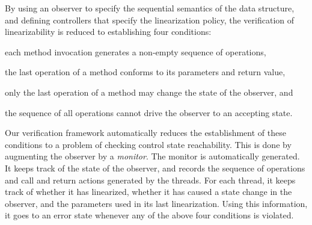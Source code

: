  By using an observer to specify the sequential semantics of the
data structure, and defining controllers that specify the linearization policy,
the verification of linearizability is reduced to establishing four conditions:
\begin{inparaenum}[(i)]
\item
  each method invocation generates a non-empty sequence of operations,
\item
  the last operation of a method conforms to its parameters and return value,
\item
  only the last operation of a method may
  change the state of the observer,
  and
\item
  the sequence of all operations
  cannot drive the observer to an accepting state.
\end{inparaenum}
Our verification framework automatically reduces
the establishment of these conditions to 
a problem of checking control state reachability. This is done by
augmenting the observer by a {\em monitor}. The monitor is automatically
generated. It keeps track of 
the state of the observer, and records the sequence of operations and
call and return actions generated by the threads.
For each thread, it keeps track of whether
it has linearized, whether it has caused a state change in the observer, and
the parameters used in its last linearization. Using this information, it
goes to an error state whenever any of the above four conditions is violated.


